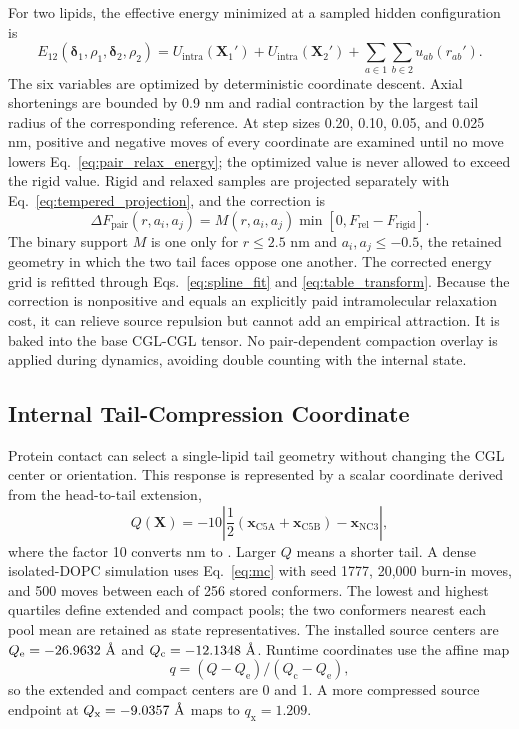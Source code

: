 \documentclass{article}
\newcommand{\angstrom}{\text{\normalfont\AA}}
\begin{document}
For two lipids, the effective energy minimized at a sampled hidden
configuration is
\begin{equation}
E_{12}(\boldsymbol\delta_1,\rho_1,
\boldsymbol\delta_2,\rho_2)
=U_{\mathrm{intra}}(\mathbf X_1')
+U_{\mathrm{intra}}(\mathbf X_2')
+\sum_{a\in1}\sum_{b\in2}u_{ab}(r_{ab}').
\label{eq:pair_relax_energy}
\end{equation}
The six variables are optimized by deterministic coordinate descent.  Axial
shortenings are bounded by 0.9 nm and radial contraction by the largest tail
radius of the corresponding reference.  At step sizes 0.20, 0.10, 0.05, and
0.025 nm, positive and negative moves of every coordinate are examined until
no move lowers Eq.~\ref{eq:pair_relax_energy}; the optimized value is never
allowed to exceed the rigid value.  Rigid and relaxed samples are projected
separately with Eq.~\ref{eq:tempered_projection}, and the correction is
\begin{equation}
\Delta F_{\mathrm{pair}}(r,a_i,a_j)=M(r,a_i,a_j)
\min[0,F_{\mathrm{rel}}-F_{\mathrm{rigid}}].
\label{eq:pair_relax}
\end{equation}
The binary support $M$ is one only for $r\leq2.5$ nm and
$a_i,a_j\leq-0.5$, the retained geometry in which the two tail faces oppose
one another.  The corrected energy grid is refitted through
Eqs.~\ref{eq:spline_fit} and \ref{eq:table_transform}.  Because the correction
is nonpositive and equals an explicitly paid intramolecular relaxation cost,
it can relieve source repulsion but cannot add an empirical attraction.  It is
baked into the base CGL-CGL tensor.  No pair-dependent compaction overlay is
applied during dynamics, avoiding double counting with the internal state.

\subsection{Internal Tail-Compression Coordinate}

Protein contact can select a single-lipid tail geometry without changing the
CGL center or orientation.  This response is represented by a scalar
coordinate derived from the head-to-tail extension,
\begin{equation}
Q(\mathbf X)=-10\left|\frac12(\mathbf x_{\mathrm{C5A}}
+\mathbf x_{\mathrm{C5B}})-\mathbf x_{\mathrm{NC3}}\right|,
\label{eq:source_q}
\end{equation}
where the factor 10 converts nm to \angstrom.  Larger $Q$ means a shorter
tail.  A dense isolated-DOPC simulation uses Eq.~\ref{eq:mc} with seed 1777,
20,000 burn-in moves, and 500 moves between each of 256 stored conformers.  The
lowest and highest quartiles define extended and compact pools; the two
conformers nearest each pool mean are retained as state representatives.  The
installed source centers are $Q_{\mathrm e}=-26.9632~\angstrom$ and
$Q_{\mathrm c}=-12.1348~\angstrom$.  Runtime coordinates use the affine map
\begin{equation}
q=(Q-Q_{\mathrm e})/(Q_{\mathrm c}-Q_{\mathrm e}),
\label{eq:q_map}
\end{equation}
so the extended and compact centers are 0 and 1.  A more compressed source
endpoint at $Q_{\mathrm x}=-9.0357~\angstrom$ maps to $q_{\mathrm x}=1.209$.
\end{document}
